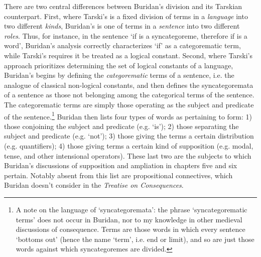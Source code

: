 \documentclass[]{article}
\begin{document}
There are two central differences between Buridan's division and its Tarskian counterpart. First, where Tarski's is a fixed division of terms in a \textit{language} into two different \textit{kinds}, Buridan's is one of terms in a \textit{sentence} into two different \textit{roles}. Thus, for instance, in the sentence `if is a syncategoreme, therefore if is a word', Buridan's analysis correctly characterizes `if' as a categorematic term, while Tarski's requires it be treated as a logical constant. Second, where Tarski's approach prioritizes determining the set of logical constants of a language, Buridan's begins by defining the \textit{categorematic} terms of a sentence, i.e. the analogue of classical non-logical constants, and then defines the syncategoremata of a sentence as those not belonging among the categorical terms of the sentence. The categorematic terms are simply those operating as the subject and predicate of the sentence.\footnote{A note on the language of `syncategoremata': the phrase `syncategorematic terms' does not occur in Buridan, nor to my knowledge in other medieval discussions of consequence. Terms are those words in which every sentence `bottoms out' (hence the name `term', i.e. end or limit), and so are just those words against which syncategoremes are divided.} Buridan then lists four types of words as pertaining to form: 1) those conjoining the subject and predicate (e.g. `is'); 2) those separating the subject and predicate (e.g. `not'); 3) those giving the terms a certain distribution (e.g. quantifiers); 4) those giving terms a certain kind of supposition (e.g. modal, tense, and other intensional operators). These last two are the subjects to which Buridan's discussions of supposition and ampliation in chapters five and six pertain. Notably absent from this list are propositional connectives, which Buridan doesn't consider in the \textit{Treatise on Consequences}.
\end{document}
